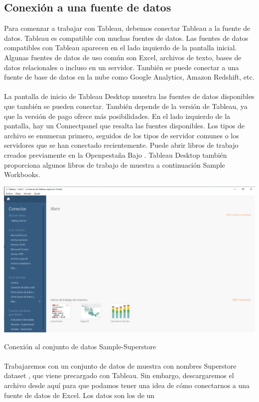 \documentclass[12pt,letterpaper]{article}
\begin{document}
\subsection{Conexión a una fuente de datos}
Para comenzar a trabajar con Tableau, debemos conectar Tableau a la fuente de datos. Tableau es
compatible con muchas fuentes de datos. Las fuentes de datos compatibles con Tableau aparecen en el
lado izquierdo de la pantalla inicial. Algunas fuentes de datos de uso común son Excel, archivos de
texto, bases de datos relacionales o incluso en un servidor. También se puede conectar a una fuente de
base de datos en la nube como Google Analytics, Amazon Redshift, etc.
\\\\La pantalla de inicio de Tableau Desktop muestra las fuentes de datos disponibles que también se
pueden conectar. También depende de la versión de Tableau, ya que la versión de pago ofrece más
posibilidades. En el lado izquierdo de la pantalla, hay un Connectpanel que resalta las fuentes
disponibles. Los tipos de archivo se enumeran primero, seguidos de los tipos de servidor comunes o los
servidores que se han conectado recientemente. Puede abrir libros de trabajo creados previamente en
la Openpestaña Bajo . Tableau Desktop también proporciona algunos libros de trabajo de muestra a
continuación Sample Workbooks.
\begin{center}
    \includegraphics[width=16cm]{img/1.png}  
\end{center}
Conexión al conjunto de datos Sample-Superstore
\\\\Trabajaremos con un conjunto de datos de muestra con nombres Superstore dataset , que viene
precargado con Tableau. Sin embargo, descargaremos el archivo desde aquí para que podamos tener
una idea de cómo conectarnos a una fuente de datos de Excel. Los datos son los de un
\end{document}
